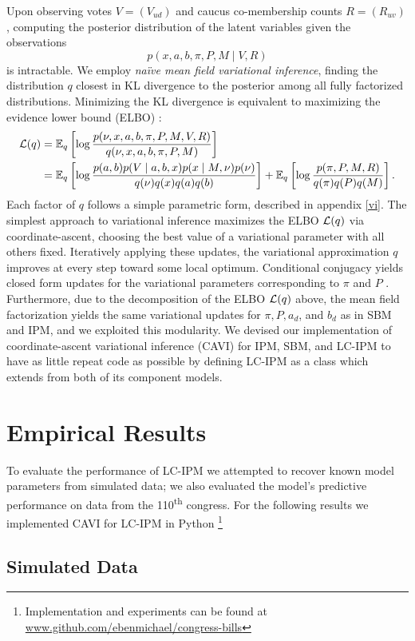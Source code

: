 \documentclass{article}
\begin{document}
Upon observing votes $V = (V_{ud})$ and caucus co-membership counts $R = (R_{uv})$, computing the posterior distribution of the latent variables given the observations
$$
p(x, a, b, \pi, P, M \mid V, R)
$$
 is intractable. We employ {\sl na\"ive mean field variational inference}, finding the distribution $q$ closest in KL divergence to the posterior among all fully factorized distributions. Minimizing the KL divergence is equivalent to maximizing the evidence lower bound (ELBO) \cite{Blei2016}:
\begin{align*}
\mathcal{L}(q)
&= \mathbb{E}_q\left[\log \frac{p(\nu, x, a, b, \pi, P, M, V, R)}{q(\nu, x, a, b, \pi, P, M)}\right] \\
&= \mathbb{E}_q\left[\log \frac{p(a, b)p(V\mid a,b,x)p(x\mid M, \nu)p(\nu)}{q(\nu)q(x)q(a)q(b)}\right]
+ \mathbb{E}_q\left[\log \frac{p(\pi, P, M, R)}{q(\pi)q(P)q(M)}\right].
\end{align*}
Each factor of $q$ follows a simple parametric form, described in appendix \ref{vi}. The simplest approach to variational inference maximizes the ELBO $\mathcal{L}(q)$ via coordinate-ascent, choosing the best value of a variational parameter with all others fixed. Iteratively applying these updates, the variational approximation $q$ improves at every step toward some local optimum. Conditional conjugacy yields closed form updates for the variational parameters corresponding to $\pi$ and $P$ \cite{Blei2016}. Furthermore, due to the decomposition of the ELBO $\mathcal{L}(q)$ above, the mean field factorization yields the same variational updates for $\pi, P, a_d$, and $b_d$ as in SBM and IPM, and we exploited this modularity. We devised our implementation of coordinate-ascent variational inference (CAVI) for IPM, SBM, and LC-IPM to have as little repeat code as possible by defining LC-IPM as a class which extends from both of its component models. 

\section{Empirical Results}
\label{results}
To evaluate the performance of LC-IPM we attempted to recover known model parameters from simulated data; we also evaluated the model's predictive performance on data from the 110\textsuperscript{th} congress. For the following results we implemented CAVI for LC-IPM in Python \footnote{Implementation and experiments can be found at \url{www.github.com/ebenmichael/congress-bills}}
\subsection{Simulated Data}
\end{document}
